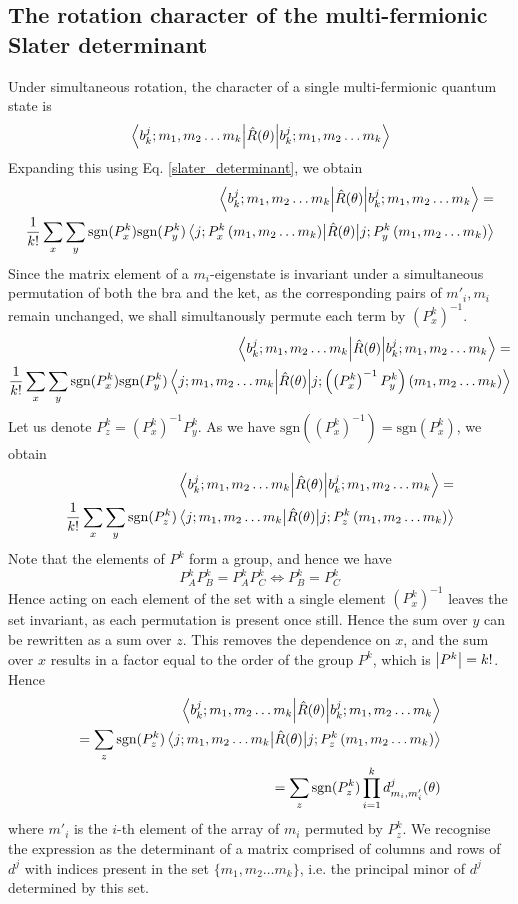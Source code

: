 \documentclass[12pt]{article}
\newcommand{\sgn}{\text{sgn}}
\begin{document}
	\subsection{The rotation character of the multi-fermionic Slater determinant}
	Under simultaneous rotation, the character of a single multi-fermionic quantum state is
	$$\mel{b^j_k; m_1, m_2\dots m_k}{\hat{R}(\theta)}{b^j_k; m_1, m_2\dots m_k}$$
	Expanding this using Eq. \ref{slater_determinant}, we obtain
	\begin{align*}
	\mel{b^j_k; m_1, m_2\dots m_k}{\hat{R}(\theta)}{b^j_k; m_1, m_2\dots m_k} =\\
	\frac{1}{k!}\sum_{x}\sum_{y} \sgn(P^k_x)\sgn(P^k_y)\mel{j; P^k_x\left(m_1, m_2\dots m_k\right)}{\hat{R}(\theta)}{j; P^k_y\left(m_1, m_2\dots m_k\right)}
	\end{align*}
	Since the matrix element of a $m_i$-eigenstate is invariant under a simultaneous permutation of both the bra and the ket, as the corresponding pairs of $m'_i, m_i$ remain unchanged, we shall simultanously permute each term by $(P^k_x)^{-1}$.
	\begin{align*}
	\mel{b^j_k; m_1, m_2\dots m_k}{\hat{R}(\theta)}{b^j_k; m_1, m_2\dots m_k} =\\
	\frac{1}{k!}\sum_{x}\sum_{y} \sgn(P^k_x)\sgn(P^k_y)\mel{j; m_1, m_2\dots m_k}{\hat{R}(\theta)}{j; \left(\left(P^k_x\right)^{-1}P^k_y\right)\left(m_1, m_2\dots m_k\right)}
	\end{align*}
	Let us denote $P^k_z=\left(P^k_x\right)^{-1}P^k_y$. As we have $\sgn(\left(P^k_x\right)^{-1})=\sgn(P^k_x)$, we obtain
	\begin{align*}
	\mel{b^j_k; m_1, m_2\dots m_k}{\hat{R}(\theta)}{b^j_k; m_1, m_2\dots m_k} =\\
	\frac{1}{k!}\sum_{x}\sum_{y} \sgn(P^k_z)\mel{j; m_1, m_2\dots m_k}{\hat{R}(\theta)}{j; P^k_z\left(m_1, m_2\dots m_k\right)}
	\end{align*}
	Note that the elements of $P^k$ form a group, and hence we have
	$$P^k_A P^k_B = P^k_A P^k_C \iff P^k_B = P^k_C$$
	Hence acting on each element of the set with a single element $\left(P^k_x\right)^{-1}$ leaves the set invariant, as each permutation is present once still. Hence the sum over $y$ can be rewritten as a sum over $z$. This removes the dependence on $x$, and the sum over $x$ results in a factor equal to the order of the group $P^k$, which is $\abs{P^k}=k!$. Hence
	\begin{align*}
	\mel{b^j_k; m_1, m_2\dots m_k}{\hat{R}(\theta)}{b^j_k; m_1, m_2\dots m_k}\\
	=\sum_{z} \sgn(P^k_z)\mel{j; m_1, m_2\dots m_k}{\hat{R}(\theta)}{j; P^k_z\left(m_1, m_2\dots m_k\right)}\\
	=\sum_{z} \sgn(P^k_z) \prod_{i=1}^k d^j_{m_i, m'_i}(\theta)
	\end{align*}
	where $m'_i$ is the $i$-th element of the array of $m_i$ permuted by $P^k_z$. We recognise the expression as the determinant of a matrix comprised of columns and rows of $d^j$ with indices present in the set $\{m_1, m_2\dots m_k\}$, i.e. the principal minor of $d^j$ determined by this set.
	
\end{document}
